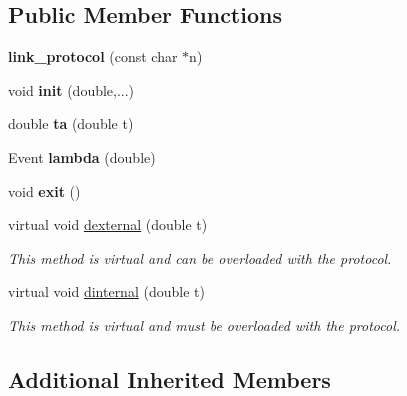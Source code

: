 \subsection*{Public Member Functions}
\begin{DoxyCompactItemize}
\item 
{\bfseries link\+\_\+protocol} (const char $\ast$n)\hypertarget{classlink__protocol_a29cc4e9d4a32ffaaebfcce0fe38af213}{}\label{classlink__protocol_a29cc4e9d4a32ffaaebfcce0fe38af213}

\item 
void {\bfseries init} (double,...)\hypertarget{classlink__protocol_a0d537bb129776e711f0523a2efc6540d}{}\label{classlink__protocol_a0d537bb129776e711f0523a2efc6540d}

\item 
double {\bfseries ta} (double t)\hypertarget{classlink__protocol_a0a9558cd1b752b9d01d98ae656b095e0}{}\label{classlink__protocol_a0a9558cd1b752b9d01d98ae656b095e0}

\item 
Event {\bfseries lambda} (double)\hypertarget{classlink__protocol_ad8e4ff0a5ac9c6057d105cacc43bab98}{}\label{classlink__protocol_ad8e4ff0a5ac9c6057d105cacc43bab98}

\item 
void {\bfseries exit} ()\hypertarget{classlink__protocol_a1439b43d737cccf1839915a46825bf35}{}\label{classlink__protocol_a1439b43d737cccf1839915a46825bf35}

\item 
virtual void \hyperlink{classlink__protocol_a41b2cf20f21b9b5b7170f8f33fd56667}{dexternal} (double t)
\begin{DoxyCompactList}\small\item\em This method is virtual and can be overloaded with the protocol. \end{DoxyCompactList}\item 
virtual void \hyperlink{classlink__protocol_abae9797f2bf160152cf43bd011742d22}{dinternal} (double t)
\begin{DoxyCompactList}\small\item\em This method is virtual and must be overloaded with the protocol. \end{DoxyCompactList}\end{DoxyCompactItemize}
\subsection*{Additional Inherited Members}


